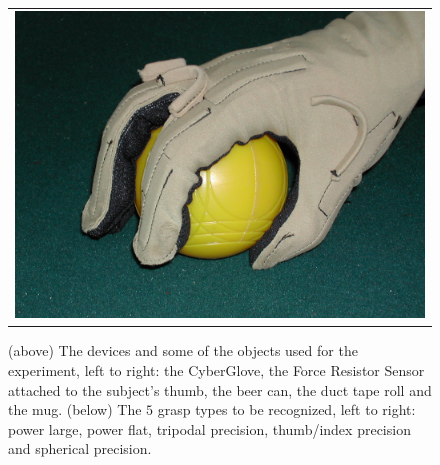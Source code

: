 \begin{figure}[!ht]
\begin{center}
\begin{tabular}{c}
      \includegraphics[height=0.08\textheight]{figs/grasping/grasp5.jpg} \\
    \end{tabular}
    \caption{(above) The devices and some of the objects used for the experiment,
    left to right: the CyberGlove, the Force Resistor Sensor attached
    to the subject's thumb, the beer can, the duct tape roll and the
    mug. (below) The $5$ grasp types to be recognized, left to right:
    power large, power flat, tripodal precision, thumb/index precision
    and spherical precision.}
    \label{fig:devices}
  \end{center}
\end{figure}



